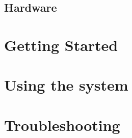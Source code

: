 \documentclass[a4paper,12pt]{article}
\begin{document}
		
				
		\subsection{Hardware}
	\section{Getting Started}
	
	\section{Using the system}
	
	\section{Troubleshooting}
	
\end{document}
